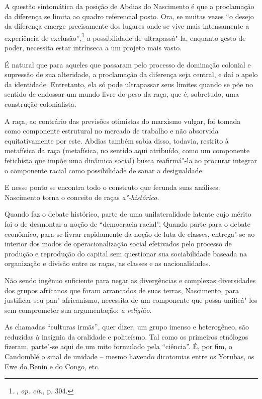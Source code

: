 A questão sintomática da posição de Abdias do Nascimento é que a
proclamação da diferença se limita ao quadro referencial posto. Ora, se
muitas vezes ``o desejo da diferença emerge precisamente dos lugares
onde se vive mais intensamente a experiência de exclusão'',\footnote{,
  \emph{op. cit.}, p. 304.} a possibilidade de ultrapassá"-la, enquanto gesto de
poder, necessita estar intrínseca a um projeto mais vasto.

É natural que para aqueles que passaram pelo processo de dominação
colonial e supressão de sua alteridade, a proclamação da diferença seja
central, e daí o apelo da identidade. Entretanto, ela só pode
ultrapassar seus limites quando se põe no sentido de endossar um mundo
livre do peso da raça, que é, sobretudo, uma construção colonialista.

A raça, ao contrário das previsões otimistas do marxismo vulgar, foi
tomada como componente estrutural no mercado de trabalho e não absorvida
equitativamente por este. Abdias também sabia disso, todavia, restrito à
metafísica da raça (metafísica, no sentido aqui atribuído, como um
componente fetichista que impõe uma dinâmica social) busca reafirmá"-la
ao procurar integrar o componente racial como possibilidade de sanar a
desigualdade.

E nesse ponto se encontra todo o construto que fecunda suas análises:
Nascimento torna o conceito de raças \emph{a"-histórico}.

Quando faz o debate histórico, parte de uma unilateralidade latente cujo
mérito foi o de desmontar a noção de ``democracia racial''. Quando parte
para o debate econômico, para se livrar rapidamente da noção de luta de
classes, entrega"-se ao interior dos modos de operacionalização social
efetivados pelo processo de produção e reprodução do capital sem
questionar sua sociabilidade baseada na organização e divisão entre as
raças, as classes e as nacionalidades.

Não sendo ingênuo suficiente para negar as divergências e complexas
diversidades dos grupos africanos que foram arrancados de suas terras,
Nascimento, para justificar seu pan"-africanismo, necessita de um
componente que possa unificá"-los sem comprometer sua argumentação:
\emph{a religião}.

As chamadas ``culturas irmãs'', quer dizer, um grupo imenso e
heterogêneo, são reduzidas à insígnia da oralidade e politeísmo. Tal
como os primeiros etnólogos fizeram, parte"-se aqui de um mito formulado
pela ``ciência''. É, por fim, o Candomblé o sinal de unidade -- mesmo
havendo dicotomias entre os Yorubas, os Ewe do Benin e do Congo, etc.

